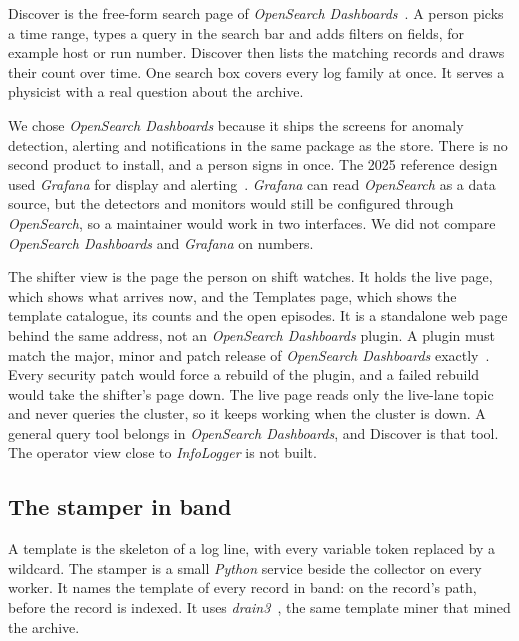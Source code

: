 Discover is the free-form search page of \textit{OpenSearch Dashboards}~\cite{ref:osddiscover}. A person picks a time range, types a query in the search bar and adds filters on fields, for example host or run number. Discover then lists the matching records and draws their count over time. One search box covers every log family at once. It serves a physicist with a real question about the archive.

We chose \textit{OpenSearch Dashboards} because it ships the screens for anomaly detection, alerting and notifications in the same package as the store. There is no second product to install, and a person signs in once. The 2025 reference design used \textit{Grafana} for display and alerting~\cite{ref:papadopoulos2025}. \textit{Grafana} can read \textit{OpenSearch} as a data source, but the detectors and monitors would still be configured through \textit{OpenSearch}, so a maintainer would work in two interfaces. We did not compare \textit{OpenSearch Dashboards} and \textit{Grafana} on numbers.

The shifter view is the page the person on shift watches. It holds the live page, which shows what arrives now, and the Templates page, which shows the template catalogue, its counts and the open episodes. It is a standalone web page behind the same address, not an \textit{OpenSearch Dashboards} plugin. A plugin must match the major, minor and patch release of \textit{OpenSearch Dashboards} exactly~\cite{ref:osdplugins}. Every security patch would force a rebuild of the plugin, and a failed rebuild would take the shifter's page down. The live page reads only the live-lane topic and never queries the cluster, so it keeps working when the cluster is down. A general query tool belongs in \textit{OpenSearch Dashboards}, and Discover is that tool. The operator view close to \textit{InfoLogger} is not built.

\subsection{The stamper in band}\label{sec:why-stamper}

A template is the skeleton of a log line, with every variable token replaced by a wildcard. The stamper is a small \textit{Python} service beside the collector on every worker. It names the template of every record in band: on the record's path, before the record is indexed. It uses \textit{drain3}~\cite{ref:drain3}, the same template miner that mined the archive.

